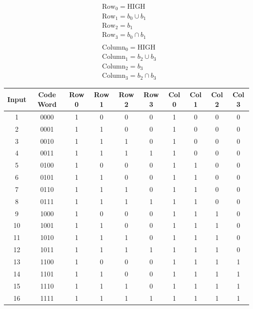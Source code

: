 \documentclass{article}
\begin{document}
\begin{equation}    
    \label{eq:4_bit_decoder_logic}
    \begin{split}
        &\text{Row}_0 = \text{HIGH}\\
        &\text{Row}_1 = b_0 \cup b_1\\
        &\text{Row}_2 = b_1\\
        &\text{Row}_3 = b_0 \cap b_1\\
        &\\
        &\text{Column}_0 = \text{HIGH}\\
        &\text{Column}_1 = b_2 \cup b_3\\
        &\text{Column}_2 = b_3\\
        &\text{Column}_3 = b_2 \cap b_3
    \end{split}
\end{equation}

\begin{center}
\begin{tabular}{ c|c|c|c|c|c|c|c|c|c }
\label{tab:4_bit_decoder_truth_table}
 Input & Code Word & Row 0 & Row 1 & Row 2 & Row 3 & Col 0 & Col 1 & Col 2 & Col 3\\ 
 \hline
 1 &  0000 & 1 & 0 & 0 & 0 & 1 & 0 & 0 & 0 \\
 2 &  0001 & 1 & 1 & 0 & 0 & 1 & 0 & 0 & 0 \\
 3 &  0010 & 1 & 1 & 1 & 0 & 1 & 0 & 0 & 0 \\
 4 &  0011 & 1 & 1 & 1 & 1 & 1 & 0 & 0 & 0 \\
 5 &  0100 & 1 & 0 & 0 & 0 & 1 & 1 & 0 & 0 \\
 6 &  0101 & 1 & 1 & 0 & 0 & 1 & 1 & 0 & 0 \\
 7 &  0110 & 1 & 1 & 1 & 0 & 1 & 1 & 0 & 0 \\
 8 &  0111 & 1 & 1 & 1 & 1 & 1 & 1 & 0 & 0 \\
 9 &  1000 & 1 & 0 & 0 & 0 & 1 & 1 & 1 & 0 \\
 10 &  1001 & 1 & 1 & 0 & 0 & 1 & 1 & 1 & 0 \\
 11 & 1010 & 1 & 1 & 1 & 0 & 1 & 1 & 1 & 0 \\
 12 & 1011 & 1 & 1 & 1 & 1 & 1 & 1 & 1 & 0 \\
 13 & 1100 & 1 & 0 & 0 & 0 & 1 & 1 & 1 & 1 \\
 14 & 1101 & 1 & 1 & 0 & 0 & 1 & 1 & 1 & 1 \\
 15 & 1110 & 1 & 1 & 1 & 0 & 1 & 1 & 1 & 1 \\
 16 & 1111 & 1 & 1 & 1 & 1 & 1 & 1 & 1 & 1 \\
 \hline
\end{tabular}
\end{center}
\end{document}
